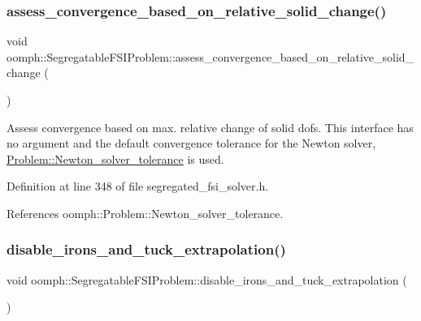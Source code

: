 \subsubsection{\texorpdfstring{assess\+\_\+convergence\+\_\+based\+\_\+on\+\_\+relative\+\_\+solid\+\_\+change()}{assess\_convergence\_based\_on\_relative\_solid\_change()}\hspace{0.1cm}{\footnotesize\ttfamily [2/2]}}
{\footnotesize\ttfamily void oomph\+::\+Segregatable\+F\+S\+I\+Problem\+::assess\+\_\+convergence\+\_\+based\+\_\+on\+\_\+relative\+\_\+solid\+\_\+change (\begin{DoxyParamCaption}{ }\end{DoxyParamCaption})\hspace{0.3cm}{\ttfamily [inline]}}



Assess convergence based on max. relative change of solid dofs. This interface has no argument and the default convergence tolerance for the Newton solver, \hyperlink{classoomph_1_1Problem_a94536b381e949edf5bb4d44434e08925}{Problem\+::\+Newton\+\_\+solver\+\_\+tolerance} is used. 



Definition at line 348 of file segregated\+\_\+fsi\+\_\+solver.\+h.



References oomph\+::\+Problem\+::\+Newton\+\_\+solver\+\_\+tolerance.

\mbox{\label{classoomph_1_1SegregatableFSIProblem_a7f0bee5113993bf9b4ce4ab846f49c0a}} 
\subsubsection{\texorpdfstring{disable\+\_\+irons\+\_\+and\+\_\+tuck\+\_\+extrapolation()}{disable\_irons\_and\_tuck\_extrapolation()}}
{\footnotesize\ttfamily void oomph\+::\+Segregatable\+F\+S\+I\+Problem\+::disable\+\_\+irons\+\_\+and\+\_\+tuck\+\_\+extrapolation (\begin{DoxyParamCaption}{ }\end{DoxyParamCaption})\hspace{0.3cm}{\ttfamily [inline]}}



